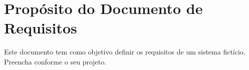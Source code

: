 \section{Propósito do Documento de Requisitos}

Este documento tem como objetivo definir os requisitos de um sistema fictício. Preencha conforme o seu projeto.
